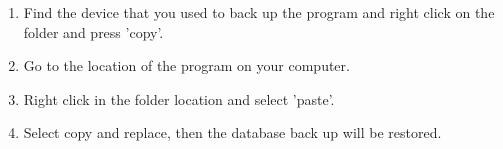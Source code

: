 \begin{enumerate}
\item Find the device that you used to back up the program and right click on the folder and press 'copy'.
\item Go to the location of the program on your computer.
\item Right click in the folder location and select 'paste'.
\item Select copy and replace, then the database back up will be restored.
\end{enumerate}

\stopcontents[chapters]

